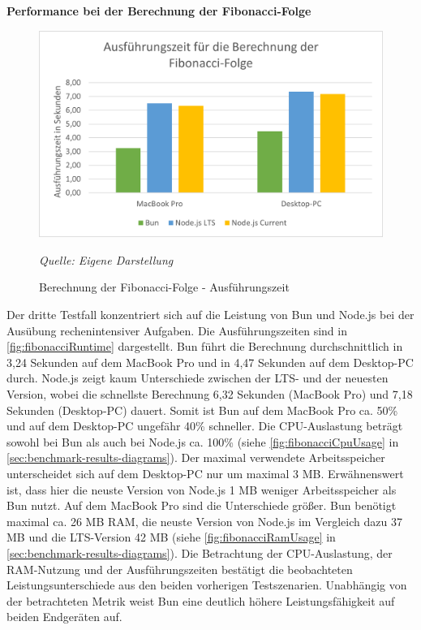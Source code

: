 \noindent
\textbf{Performance bei der Berechnung der Fibonacci-Folge}
\begin{figure}[h!]
	\centering
	\includegraphics[width=\linewidth]{./images/fibonacciRuntime.png}
	\caption{Berechnung der Fibonacci-Folge - Ausführungszeit}
	\label{fig:fibonacciRuntime}
	\textit{Quelle: Eigene Darstellung}
\end{figure}


\noindent
Der dritte Testfall konzentriert sich auf die Leistung von Bun und Node.js bei der Ausübung rechenintensiver Aufgaben. Die Ausführungszeiten sind in \autoref{fig:fibonacciRuntime} dargestellt. Bun führt die Berechnung durchschnittlich in 3,24 Sekunden auf dem MacBook Pro und in 4,47 Sekunden auf dem Desktop-PC durch. Node.js zeigt kaum Unterschiede zwischen der LTS- und der neuesten Version, wobei die schnellste Berechnung 6,32 Sekunden (MacBook Pro) und 7,18 Sekunden (Desktop-PC) dauert. Somit ist Bun auf dem MacBook Pro ca. 50\% und auf dem Desktop-PC ungefähr 40\% schneller. Die CPU-Auslastung beträgt sowohl bei Bun als auch bei Node.js ca. 100\% (siehe \autoref{fig:fibonacciCpuUsage} in \autoref{sec:benchmark-results-diagrams}). Der maximal verwendete Arbeitsspeicher unterscheidet sich auf dem Desktop-PC nur um maximal 3 MB. Erwähnenswert ist, dass hier die neuste Version von Node.js 1 MB weniger Arbeitsspeicher als Bun nutzt. Auf dem MacBook Pro sind die Unterschiede größer. Bun benötigt maximal ca. 26 MB RAM, die neuste Version von Node.js im Vergleich dazu 37 MB und die LTS-Version 42 MB (siehe \autoref{fig:fibonacciRamUsage} in \autoref{sec:benchmark-results-diagrams}).\newline
Die Betrachtung der CPU-Auslastung, der RAM-Nutzung und der Ausführungszeiten bestätigt die beobachteten Leistungsunterschiede aus den beiden vorherigen Testszenarien. Unabhängig von der betrachteten Metrik weist Bun eine deutlich höhere Leistungsfähigkeit auf beiden Endgeräten auf.

